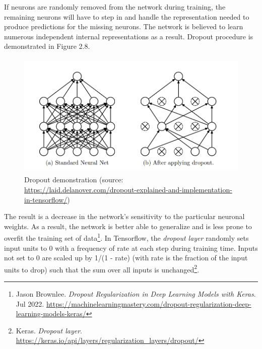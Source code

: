 If neurons are randomly removed from the network during training, the remaining neurons will have to step in and handle the representation needed to produce predictions for the missing neurons. The network is believed to learn numerous independent internal representations as a result. Dropout procedure is demonstrated in Figure 2.8.
\begin{figure}[ht]
	\centering
	\includegraphics[width=\linewidth, height=6cm,keepaspectratio]{figures/dropout.png}
   \caption{Dropout demonstration (source: \url{https://laid.delanover.com/dropout-explained-and-implementation-in-tensorflow/})}
\end{figure}

\newpage
The result is a decrease in the network's sensitivity to the particular neuronal weights. As a result, the network is better able to generalize and is less prone to overfit the training set of data\footnote{
	Jason Brownlee. \textit{Dropout Regularization in Deep Learning Models with Keras}. Jul 2022. \url{https://machinelearningmastery.com/dropout-regularization-deep-learning-models-keras/}
}.
In Tensorflow, the \emph{dropout layer} randomly sets input units to 0 with a frequency of rate
at each step during training time. Inputs not set to 0 are scaled up by 1/(1 - rate)  (with rate is the fraction of the input units to drop) such that the sum over all inputs is unchanged\footnote{Keras. \textit{Dropout layer}. \url{https://keras.io/api/layers/regularization_layers/dropout/}}.
